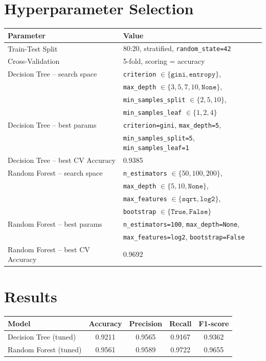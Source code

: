 \documentclass[12pt,a4paper]{article}
\begin{document}
\section{Hyperparameter Selection}
\begin{tabular}{ll}
\toprule
Parameter & Value\\
\midrule
Train-Test Split & 80:20, stratified, \texttt{random\_state=42}\\
Cross-Validation & 5-fold, scoring = accuracy\\
Decision Tree -- search space & \texttt{criterion} $\in\{\texttt{gini},\texttt{entropy}\}$,\\
& \texttt{max\_depth} $\in\{3,5,7,10,\texttt{None}\}$,\\
& \texttt{min\_samples\_split} $\in\{2,5,10\}$,\\
& \texttt{min\_samples\_leaf} $\in\{1,2,4\}$\\
Decision Tree -- best params & \texttt{criterion=gini}, \texttt{max\_depth=5},\\
& \texttt{min\_samples\_split=5}, \texttt{min\_samples\_leaf=1}\\
Decision Tree -- best CV Accuracy & 0.9385\\
Random Forest -- search space & \texttt{n\_estimators} $\in\{50,100,200\}$,\\
& \texttt{max\_depth} $\in\{5,10,\texttt{None}\}$,\\
& \texttt{max\_features} $\in\{\texttt{sqrt},\texttt{log2}\}$,\\
& \texttt{bootstrap} $\in\{\texttt{True},\texttt{False}\}$\\
Random Forest -- best params & \texttt{n\_estimators=100}, \texttt{max\_depth=None},\\
& \texttt{max\_features=log2}, \texttt{bootstrap=False}\\
Random Forest -- best CV Accuracy & 0.9692\\
\bottomrule
\end{tabular}

\section{Results}
\begin{longtable}{lcccc}
\toprule
Model & Accuracy & Precision & Recall & F1-score\\
\midrule
Decision Tree (tuned) & 0.9211 & 0.9565 & 0.9167 & 0.9362\\
Random Forest (tuned) & 0.9561 & 0.9589 & 0.9722 & 0.9655\\
\bottomrule
\end{longtable}
\end{document}
